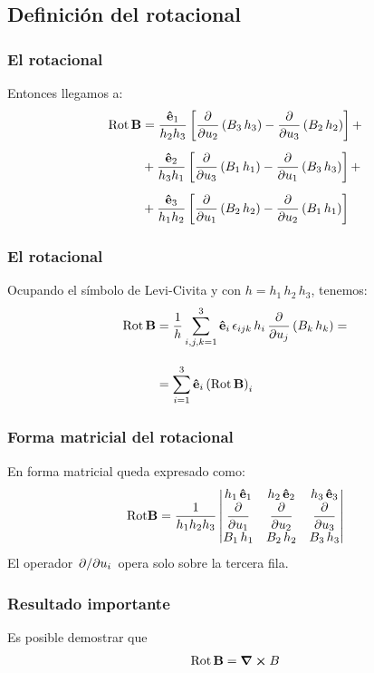 \documentclass[12pt]{beamer}
\begin{document}
\subsection{Definición del rotacional}
\begin{frame}
\frametitle{El rotacional}
Entonces llegamos a:
\begin{align*}
{\rm Rot} \, \vb{B} &= \dfrac{\vu{e}_{1}}{h_{2} h_{3}} \left[ \displaystyle \pdv{u_{2}} \left( B_{3} \, h_{3} \right) - \pdv{u_{3}} \left( B_{2} \, h_{2} \right) \right] + \\[0.5em]
&+ \dfrac{\vu{e}_{2}}{h_{3} h_{1}} \left[ \displaystyle \pdv{u_{3}} \left( B_{1} \, h_{1} \right) - \pdv{u_{1}} \left( B_{3} \, h_{3} \right) \right] + \\[0.5em]
&+ \dfrac{\vu{e}_{3}}{h_{1} h_{2}} \left[ \displaystyle \pdv{u_{1}} \left( B_{2} \, h_{2} \right) - \pdv{u_{2}} \left( B_{1} \, h_{1} \right) \right]
\end{align*}
\end{frame}
\begin{frame}
\frametitle{El rotacional}
Ocupando el símbolo de Levi-Civita y con $h = h_{1} \, h_{2} \, h_{3}$, tenemos:
\begin{align}
\begin{aligned}
{\rm Rot} \, \vb{B} &= \dfrac{1}{h} \sum_{i,j,k=1}^{3} \vu{e}_{i} \, \epsilon_{ijk} \, h_{i} \, \pdv{u_{j}} \left( B_{k} \, h_{k} \right) = \\[1em]
&= \sum_{i=1}^{3} \vu{e}_{i} \left( {\rm Rot} \, \vb{B} \right)_{i}
\end{aligned}
\label{eq:ecuacion_01_34}
\end{align}
\end{frame}
\begin{frame}
\frametitle{Forma matricial del rotacional}
En forma matricial queda expresado como:
\begin{align*}
{\rm Rot} \vb{B} = \dfrac{1}{h_{1} h_{2} h_{3}}\mdet{
h_{1} \, \vu{e}_{1} & h_{2} \, \vu{e}_{2} & h_{3} \, \vu{e}_{3} \\
\displaystyle \pdv{u_{1}} & \displaystyle \pdv{u_{2}} & \displaystyle \pdv{u_{3}} \\
B_{1} \, h_{1} & B_{2} \, h_{2} & B_{3} \, h_{3}
}
\end{align*}
El operador $\pdv*{u_{i}}$ opera solo sobre la tercera fila.
\end{frame}
\begin{frame}
\frametitle{Resultado importante}
Es posible demostrar que
\begin{align*}
{\rm Rot} \, \vb{B} = \curl{B}
\end{align*}
\end{frame}
\end{document}
